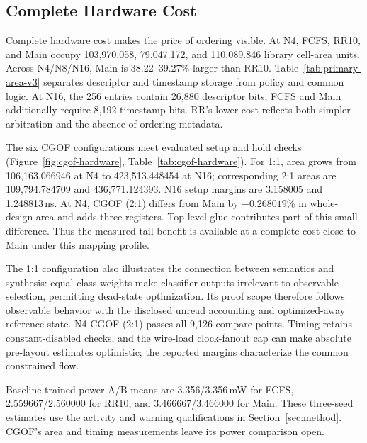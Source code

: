 \subsection{Complete Hardware Cost}

Complete hardware cost makes the price of ordering visible. At N4, FCFS, RR10, and Main occupy 103,970.058, 79,047.172, and 110,089.846 library cell-area units. Across N4/N8/N16, Main is 38.22--39.27\% larger than RR10. Table~\ref{tab:primary-area-v3} separates descriptor and timestamp storage from policy and common logic. At N16, the 256 entries contain 26,880 descriptor bits; FCFS and Main additionally require 8,192 timestamp bits. RR's lower cost reflects both simpler arbitration and the absence of ordering metadata.

The six CGOF configurations meet evaluated setup and hold checks (Figure~\ref{fig:cgof-hardware}, Table~\ref{tab:cgof-hardware}). For 1:1, area grows from 106,163.066946 at N4 to 423,513.448454 at N16; corresponding 2:1 areas are 109,794.784709 and 436,771.124393. N16 setup margins are 3.158005 and 1.248813\,ns. At N4, CGOF (2:1) differs from Main by $-0.268019\%$ in whole-design area and adds three registers. Top-level glue contributes part of this small difference. Thus the measured tail benefit is available at a complete cost close to Main under this mapping profile.

The 1:1 configuration also illustrates the connection between semantics and synthesis: equal class weights make classifier outputs irrelevant to observable selection, permitting dead-state optimization. Its proof scope therefore follows observable behavior with the disclosed unread accounting and optimized-away reference state. N4 CGOF (2:1) passes all 9,126 compare points. Timing retains constant-disabled checks, and the wire-load clock-fanout cap can make absolute pre-layout estimates optimistic; the reported margins characterize the common constrained flow.

Baseline trained-power A/B means are 3.356/3.356\,mW for FCFS, 2.559667/2.560000 for RR10, and 3.466667/3.466000 for Main. These three-seed estimates use the activity and warning qualifications in Section~\ref{sec:method}. CGOF's area and timing measurements leave its power comparison open.

\balance
